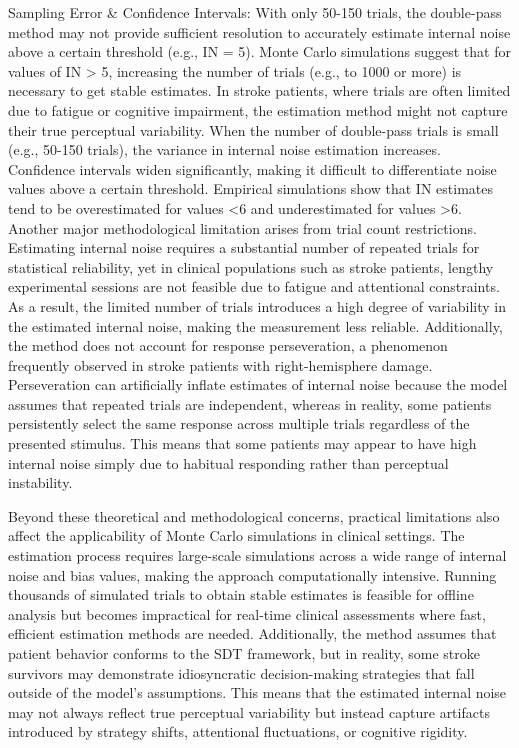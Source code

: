Sampling Error \& Confidence Intervals:
With only 50-150 trials, the double-pass method may not provide sufficient resolution to accurately estimate internal noise above a certain threshold (e.g., IN = 5).
Monte Carlo simulations suggest that for values of IN > 5, increasing the number of trials (e.g., to 1000 or more) is necessary to get stable estimates.
In stroke patients, where trials are often limited due to fatigue or cognitive impairment, the estimation method might not capture their true perceptual variability.
When the number of double-pass trials is small (e.g., 50-150 trials), the variance in internal noise estimation increases.
Confidence intervals widen significantly, making it difficult to differentiate noise values above a certain threshold.
Empirical simulations show that IN estimates tend to be overestimated for values <6 and underestimated for values >6.
Another major methodological limitation arises from trial count restrictions. Estimating internal noise requires a substantial number of repeated trials for statistical reliability, yet in clinical populations such as stroke patients, lengthy experimental sessions are not feasible due to fatigue and attentional constraints. As a result, the limited number of trials introduces a high degree of variability in the estimated internal noise, making the measurement less reliable. Additionally, the method does not account for response perseveration, a phenomenon frequently observed in stroke patients with right-hemisphere damage. Perseveration can artificially inflate estimates of internal noise because the model assumes that repeated trials are independent, whereas in reality, some patients persistently select the same response across multiple trials regardless of the presented stimulus. This means that some patients may appear to have high internal noise simply due to habitual responding rather than perceptual instability.

Beyond these theoretical and methodological concerns, practical limitations also affect the applicability of Monte Carlo simulations in clinical settings. The estimation process requires large-scale simulations across a wide range of internal noise and bias values, making the approach computationally intensive. Running thousands of simulated trials to obtain stable estimates is feasible for offline analysis but becomes impractical for real-time clinical assessments where fast, efficient estimation methods are needed. Additionally, the method assumes that patient behavior conforms to the SDT framework, but in reality, some stroke survivors may demonstrate idiosyncratic decision-making strategies that fall outside of the model’s assumptions. This means that the estimated internal noise may not always reflect true perceptual variability but instead capture artifacts introduced by strategy shifts, attentional fluctuations, or cognitive rigidity.

